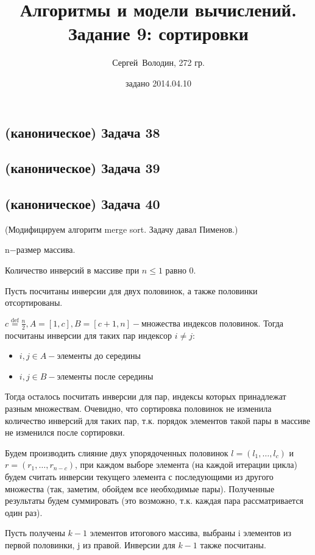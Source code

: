\documentclass[a4paper]{article}
\date{задано 2014.04.10}
\author{Сергей~Володин, 272 гр.}
\title{Алгоритмы и модели вычислений.\\Задание 9: сортировки}
\begin{document}
\maketitle
\subsection*{(каноническое) Задача 38}
\subsection*{(каноническое) Задача 39}
\subsection*{(каноническое) Задача 40}
(Модифицируем алгоритм merge sort. Задачу давал Пименов.)
  
  n$-$размер массива.
  
  Количество инверсий в массиве при $n \leqslant
  1$ равно 0.
  
  Пусть посчитаны инверсии для двух
  половинок, а также половинки
  отсортированы.
  
  $c \overset{\mbox{def}}{=} \frac{n}{2}, A = \left[ 1, c \right], B = \left[
  c + 1, n \right] -$множества индексов половинок.
  Тогда посчитаны инверсии для таких пар
  индексор $i \neq j :$
  \begin{itemize}
    \item $i, j \in A -$элементы до середины
    
    \item $i, j \in B -$элементы после середины
  \end{itemize}
  Тогда осталось посчитать инверсии для
  пар, индексы которых принадлежат разным
  множествам. Очевидно, что сортировка
  половинок не изменила количество
  инверсий для таких пар, т.к. порядок
  элементов такой пары в массиве не
  изменился после сортировки.
  
  Будем производить слияние двух
  упорядоченных половинок $l = \left( l_1, \ldots, l_c
  \right)$ и $r = \left( r_1, \ldots, r_{n - c} \right)$, при каждом
  выборе элемента (на каждой итерации
  цикла) будем считать инверсии текущего
  элемента с последующими из другого
  множества (так, заметим, обойдем все
  необходимые пары). Полученные результаты
  будем суммировать (это возможно, т.к.
  каждая пара рассматривается один раз).
  
  Пусть получены $k - 1$ элементов итогового
  массива, выбраны i элементов из первой
  половинки, j из правой. Инверсии для $k - 1$
  также посчитаны.
  
\end{document}
